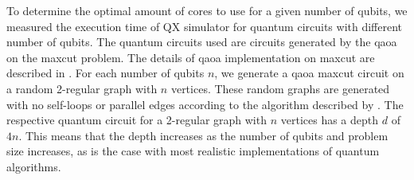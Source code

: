 To determine the optimal amount of cores to use for a given number of qubits, we measured the execution time of QX simulator for quantum circuits with different number of qubits.
The quantum circuits used are circuits generated by the \gls{qaoa} on the \gls{maxcut} problem.
The details of \gls{qaoa} implementation on \gls{maxcut} are described in .
For each number of qubits $n$, we generate a \gls{qaoa} \gls{maxcut} circuit on a random 2-regular graph with $n$ vertices.
These random graphs are generated with no self-loops or parallel edges according to the algorithm described by \textcite{steger1999generating}.
The respective quantum circuit for a 2-regular graph with $n$ vertices has a depth $d$ of $4n$.
This means that the depth increases as the number of qubits and problem size increases, as is the case with most realistic implementations of quantum algorithms.


